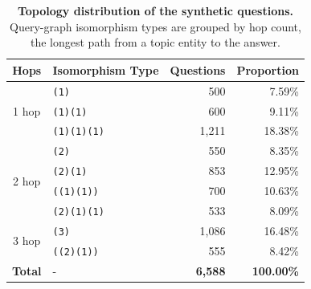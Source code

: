 \begin{table}[t]
  \centering
  \small
  
  \begin{tabular}{clrr}
  \toprule
  \textbf{Hops} & \textbf{Isomorphism Type} & \textbf{Questions} & \textbf{Proportion} \\
  \midrule
  \multirow{3}{*}{1 hop}
    & \texttt{(1)}           & 500 & 7.59\% \\
    & \texttt{(1)(1)}        & 600 & 9.11\% \\
    & \texttt{(1)(1)(1)}     & 1,211 & 18.38\% \\
  \midrule
  \multirow{4}{*}{2 hop}
    & \texttt{(2)}           & 550 & 8.35\% \\
    & \texttt{(2)(1)}        & 853 & 12.95\% \\
    & \texttt{((1)(1))}      & 700 & 10.63\% \\
    & \texttt{(2)(1)(1)}     & 533 & 8.09\% \\
  \midrule
  \multirow{2}{*}{3 hop}
    & \texttt{(3)}           & 1,086 & 16.48\% \\
    & \texttt{((2)(1))}      & 555 & 8.42\% \\
  \midrule
  \textbf{Total} & - & \textbf{6,588} & \textbf{100.00\%} \\
  \bottomrule
  \end{tabular}
\caption{\textbf{Topology distribution of the synthetic questions.} Query-graph isomorphism types are grouped by hop count, the longest path from a topic entity to the answer.}
\label{tab:distribution}
  \end{table}
